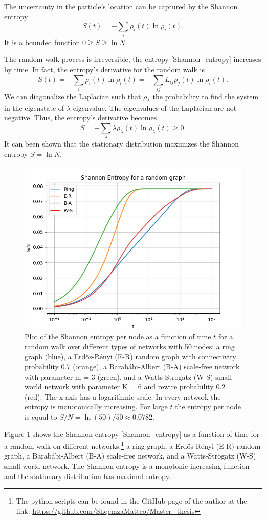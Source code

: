 The uncertainty in the particle's location can be captured by the Shannon entropy
\begin{equation}\label{Shannon_entropy}
    S(t) = -\sum_i \rho_i(t)\ln \rho_i(t).
\end{equation}
It is a bounded function $0\geq S \geq \ln N$.

The random walk process is irreversible, the entropy \eqref{Shannon_entropy} increases by time. 
In fact, the entropy's derivative for the random walk is
\begin{equation}
        \dot S(t) = -\sum_i \dot\rho_i(t)\ln \rho_i(t) = -\sum_{ij} L_{ij} \rho_j(t)\ln \rho_i(t).
\end{equation}
We can diagonalize the Laplacian such that $\rho_\lambda$ the probability to find the system in the eigenstate of $\lambda$ eigenvalue.
The eigenvalues of the Laplacian are not negative. Thus, the entropy's derivative becomes
\begin{equation}
    \dot S = -\sum_\lambda \lambda \rho_\lambda(t) \ln \rho_\lambda(t) \geq 0.
\end{equation}
It can been shown that the stationary distribution maximizes the Shannon entropy $S = \ln N$.


\begin{figure}[ht!]
    \centering
    \includegraphics[width=0.70\linewidth]{image/Shannon_entropy.png}
    \caption{Plot of the Shannon entropy per node as a function of time $t$ for a random walk over different types of networks with 50 nodes: a ring graph (blue), a Erd\H{o}s-Rényi (E-R) random graph with connectivity probability 0.7 (orange), a Barab\'abi-Albert (B-A) scale-free network with parameter m = 3 (green), and a Watts-Strogatz (W-S) small world network with parameter K = 6 and rewire probability 0.2 (red). The x-axis has a logarithmic scale. In every network the entropy is monotonically increasing. For large $t$ the entropy per node is equal to $S/N = \ln(50)/50 \approx 0.0782$. }
    \label{Fig:Shannon_entropy}
\end{figure}
Figure \ref{Fig:Shannon_entropy} shows the Shannon entropy \eqref{Shannon_entropy} as a function of time for a random walk on different networks:\footnote{The python scripts can be found in the GitHub page of the author at the link: \url{https://github.com/ShqemzaMatteo/Master_thesis}} a ring graph, a Erd\H{o}s-Rényi (E-R) random graph, a Barab\'abi-Albert (B-A) scale-free network, and a Watts-Strogatz (W-S) small world network. The Shannon entropy is a monotonic increasing function and the stationary distribution has maximal entropy.